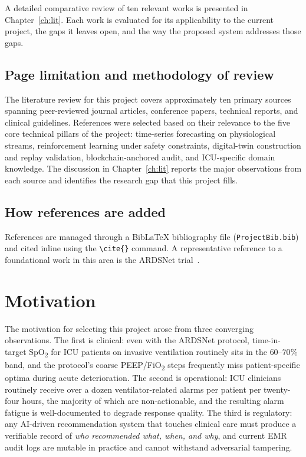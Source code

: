 \documentclass[12pt,a4paper,oneside]{report}
\begin{document}
A detailed comparative review of ten relevant works is presented in Chapter~\ref{ch:lit}. Each work is evaluated for its applicability to the current project, the gaps it leaves open, and the way the proposed system addresses those gaps.

\subsection{Page limitation and methodology of review}
The literature review for this project covers approximately ten primary sources spanning peer-reviewed journal articles, conference papers, technical reports, and clinical guidelines. References were selected based on their relevance to the five core technical pillars of the project: time-series forecasting on physiological streams, reinforcement learning under safety constraints, digital-twin construction and replay validation, blockchain-anchored audit, and ICU-specific domain knowledge. The discussion in Chapter~\ref{ch:lit} reports the major observations from each source and identifies the research gap that this project fills.

\subsection{How references are added}
References are managed through a BibLaTeX bibliography file (\texttt{ProjectBib.bib}) and cited inline using the \texttt{\textbackslash cite\{\}} command. A representative reference to a foundational work in this area is the ARDSNet trial~\cite{ards2000}.

\section{Motivation}
The motivation for selecting this project arose from three converging observations. The first is clinical: even with the ARDSNet protocol, time-in-target SpO\textsubscript{2} for ICU patients on invasive ventilation routinely sits in the $60\text{--}70\%$ band, and the protocol's coarse PEEP/FiO\textsubscript{2} steps frequently miss patient-specific optima during acute deterioration. The second is operational: ICU clinicians routinely receive over a dozen ventilator-related alarms per patient per twenty-four hours, the majority of which are non-actionable, and the resulting alarm fatigue is well-documented to degrade response quality. The third is regulatory: any AI-driven recommendation system that touches clinical care must produce a verifiable record of \emph{who recommended what, when, and why}, and current EMR audit logs are mutable in practice and cannot withstand adversarial tampering.
\end{document}
